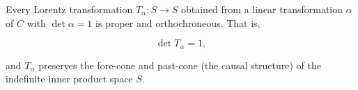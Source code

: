 Every Lorentz transformation $T_{\alpha}: S \to S$ obtained from a linear transformation $\alpha$ of $C$ with $\det \alpha = 1$ is proper and orthochroneous. That is,

$$\det T_{\alpha} = 1,$$

and $T_{\alpha}$ preserves the fore-cone and past-cone (the causal structure) of the indefinite inner product space $S$.

